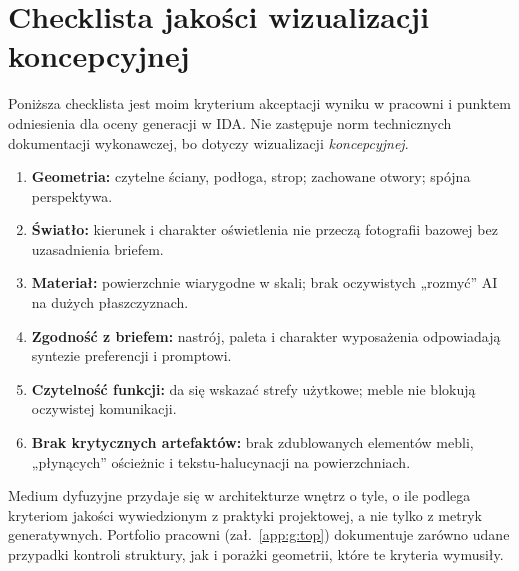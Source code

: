 \section{Checklista jakości wizualizacji koncepcyjnej}
\label{ch04:sec:checklista}

Poniższa checklista jest moim kryterium akceptacji wyniku w pracowni i punktem odniesienia dla oceny generacji w IDA. Nie zastępuje norm technicznych dokumentacji wykonawczej, bo dotyczy wizualizacji \emph{koncepcyjnej}.

\begin{enumerate}
  \item \textbf{Geometria:} czytelne ściany, podłoga, strop; zachowane otwory; spójna perspektywa.
  \item \textbf{Światło:} kierunek i charakter oświetlenia nie przeczą fotografii bazowej bez uzasadnienia briefem.
  \item \textbf{Materiał:} powierzchnie wiarygodne w skali; brak oczywistych „rozmyć” AI na dużych płaszczyznach.
  \item \textbf{Zgodność z briefem:} nastrój, paleta i charakter wyposażenia odpowiadają syntezie preferencji i promptowi.
  \item \textbf{Czytelność funkcji:} da się wskazać strefy użytkowe; meble nie blokują oczywistej komunikacji.
  \item \textbf{Brak krytycznych artefaktów:} brak zdublowanych elementów mebli, „płynących” ościeżnic i tekstu-halucynacji na powierzchniach.
\end{enumerate}

Medium dyfuzyjne przydaje się w architekturze wnętrz o tyle, o ile podlega kryteriom jakości wywiedzionym z praktyki projektowej, a nie tylko z metryk generatywnych.
Portfolio pracowni (zał.~\ref{app:g:top}) dokumentuje zarówno udane przypadki kontroli struktury, jak i porażki geometrii, które te kryteria wymusiły.
